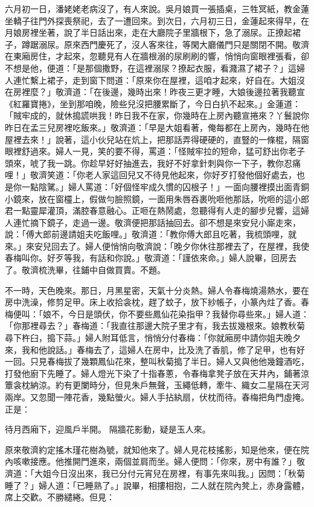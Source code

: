 六月初一日，潘姥姥老病沒了，有人來說。吳月娘買一張插桌，三牲冥紙，教金蓮坐轎子往門外探喪祭祀，去了一遭回來。到次日，六月初三日，金蓮起來得早，在月娘房裡坐著，說了半日話出來，走在大廳院子里牆根下，急了溺尿。正撩起裙子，蹲踞溺尿。原來西門慶死了，沒人客來往，等閑大廳儀門只是關閉不開。敬濟在東廂房住，才起來，忽聽見有人在牆根溺的尿刷刷的響，悄悄向窗眼裡張看，卻不想是他，便道：「是那個撒野，在這裡溺尿？撩起衣服，看濺濕了裙子？」這婦人連忙繫上裙子，走到窗下問道：「原來你在屋裡，這咱才起來，好自在。大姐沒在房裡麼？」敬濟道：「在後邊，幾時出來！昨夜三更才睡，大娘後邊拉著我聽宣《紅羅寶捲》，坐到那咱晚，險些兒沒把腰累斷了，今日白扒不起來。」金蓮道：「賊牢成的，就休搗謊哄我！昨日我不在家，你幾時在上房內聽宣捲來？丫鬟說你昨日在孟三兒房裡吃飯來。」敬濟道：「早是大姐看著，俺每都在上房內，幾時在他屋裡去來！」說著，這小伙兒站在炕上，把那話弄得硬硬的，直豎的一條棍，隔窗眼裡舒過來。婦人一見，笑的要不得，罵道：「怪賊牢拉的短命，猛可舒出你老子頭來，唬了我一跳。你趁早好好抽進去，我好不好拿針刺與你一下子，教你忍痛哩！」敬濟笑道：「你老人家這回兒又不待見他起來，你好歹打發他個好處去，也是你一點陰騭。」婦人罵道：「好個怪牢成久慣的囚根子！」一面向腰裡摸出面青銅小鏡來，放在窗欞上，假做勻臉照鏡，一面用朱唇吞裹吮咂他那話，吮咂的這小郎君一點靈犀灌頂，滿腔春意融心。正咂在熱鬧處，忽聽得有人走的腳步兒響，這婦人連忙摘下鏡子，走過一邊。敬濟便把那話抽回去。卻不想是來安兒小廝走來，說：「傅大郎前邊請姐夫吃飯哩。」敬濟道：「教你傅大郎且吃著，我梳頭哩，就來。」來安兒回去了。婦人便悄悄向敬濟說：「晚夕你休往那裡去了，在屋裡，我使春梅叫你。好歹等我，有話和你說。」敬濟道：「謹依來命。」婦人說畢，回房去了。敬濟梳洗畢，往鋪中自做買賣。不題。

不一時，天色晚來。那日，月黑星密，天氣十分炎熱。婦人令春梅燒湯熱水，要在房中洗澡，修剪足甲。床上收拾衾枕，趕了蚊子，放下紗帳子，小篆內炷了香。春梅便叫：「娘不，今日是頭伏，你不要些鳳仙花染指甲？我替你尋些來。」婦人道：「你那裡尋去？」春梅道：「我直往那邊大院子里才有，我去拔幾根來。娘教秋菊尋下杵臼，搗下蒜。」婦人附耳低言，悄悄分付春梅：「你就廂房中請你姐夫晚夕來，我和他說話。」春梅去了，這婦人在房中，比及洗了香肌，修了足甲，也有好一回。只見春梅拔了幾顆鳳仙花來，整叫秋菊搗了半日。婦人又與他他幾鐘酒吃，打發他廚下先睡了。婦人燈光下染了十指春蔥，令春梅拿凳子放在天井內，鋪著涼簟衾枕納涼。約有更闌時分，但見朱戶無聲，玉繩低轉，牽牛、織女二星隔在天河兩岸。又忽聞一陣花香，幾點螢火。婦人手拈紈扇，伏枕而待。春梅把角門虛掩。正是：

待月西廂下，迎風戶半開。
隔牆花影動，疑是玉人來。

原來敬濟約定搖木瑾花樹為號，就知他來了。婦人見花枝搖影，知是他來，便在院內咳嗽接應。他推開門進來，兩個並肩而坐。婦人便問：「你來，房中有誰？」敬濟道：「大姐今日沒出來，我已分付元宵兒在房裡，有事先來叫我。」因問：「秋菊睡了？」婦人道：「已睡熟了。」說畢，相摟相抱，二人就在院內凳上，赤身露體，席上交歡。不勝繾綣。但見：

